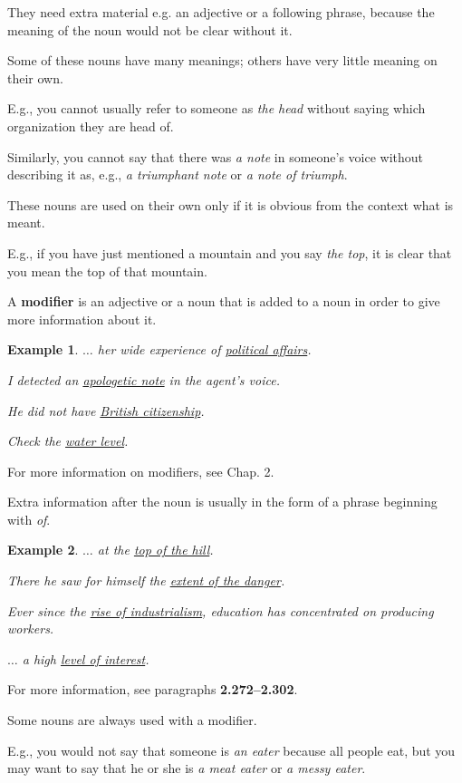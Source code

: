 \documentclass[oneside]{book}
\numberwithin{equation}{section}
\newtheorem{example}{Example}[section]
\begin{document}
They need extra material e.g. an adjective or a following phrase, because the meaning of the noun would not be clear without it.

Some of these nouns have many meanings; others have very little meaning on their own.

%
E.g., you cannot usually refer to someone as \textit{the head} without saying which organization they are head of.

Similarly, you cannot say that there was \textit{a note} in someone's voice without describing it as, e.g., \textit{a triumphant note} or \textit{a note of triumph}.

%
These nouns are used on their own only if it is obvious from the context what is meant.

E.g., if you have just mentioned a mountain and you say \textit{the top}, it is clear that you mean the top of that mountain.

%
\noindent{} A \textbf{modifier} is an adjective or a noun that is added to a noun in order to give more information about it.
\begin{example}
    $\ldots$ her wide experience of \underline{political affairs}.
    
    I detected an \underline{apologetic note} in the agent's voice.
    
    He did not have \underline{British citizenship}.
    
    Check the \underline{water level}.
\end{example}
For more information on modifiers, see Chap. 2.

%
\noindent{} Extra information after the noun is usually in the form of a phrase beginning with \textit{of}.
\begin{example}
    $\ldots$ at the \underline{top of the hill}.
    
    There he saw for himself the \underline{extent of the danger}.
    
    Ever since the \underline{rise of industrialism}, education has concentrated on producing workers.
    
    $\ldots$ a high \underline{level of interest}.
\end{example}
For more information, see paragraphs \textbf{2.272--2.302}.

%
\noindent{} Some nouns are always used with a modifier.

E.g., you would not say that someone is \textit{an eater} because all people eat, but you may want to say that he or she is \textit{a meat eater} or \textit{a messy eater}.
\end{document}
